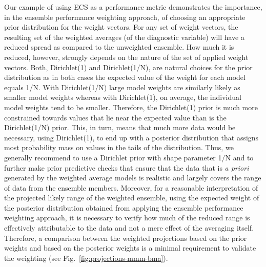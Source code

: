 Our example of using ECS as a performance metric demonstrates the importance, in the ensemble performance weighting approach, of choosing an appropriate prior distribution for the weight vectors. For any set of weight vectors, the resulting set of the weighted averages (of the diagnostic variable) will have a reduced spread as compared to the unweighted ensemble. How much it is reduced, however, strongly depends on the nature of the set of applied weight vectors. Both, Dirichlet(1) and Dirichlet(1/N), are natural choices for the prior distribution as in both cases the expected value of the weight for each model equals 1/N. With Dirichlet(1/N) large model weights are similarly likely as smaller model weights whereas with Dirichlet(1), on average, the individual model weights tend to be smaller. Therefore, the Dirichlet(1) prior is much more constrained towards values that lie near the expected value than is the Dirichlet(1/N) prior. This, in turn, means that much more data would be necessary, using Dirichlet(1),  to end up with a posterior distribution that assigns most probability mass on values in the tails of the distribution. Thus, we generally recommend to use a Dirichlet prior with shape parameter 1/N and to further make prior predictive checks that ensure that the data that is \emph{a priori} generated by the weighted average models is realistic and largely covers the range of data from the ensemble members.
Moreover, for a reasonable interpretation of the projected likely range of the weighted ensemble, using the expected weight of the posterior distribution obtained from applying the ensemble performance weighting approach, it is necessary to verify how much of the reduced range is effectively attributable to the data and not a mere effect of the averaging itself. Therefore, a comparison between the weighted projections based on the prior weights and based on the posterior weights is a minimal requirement to validate the weighting (see Fig.~\ref{fig:projections-mmm-bma}).

